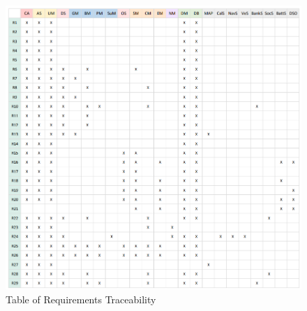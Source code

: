 \documentclass[../main.tex]{subfiles}
\begin{document}
\begin{figure}[H]
    \includegraphics[width=1.05\textwidth]{images/Traceability.png}
    \caption{Table of Requirements Traceability}
    \label{fig:traceability}
\end{figure}
\end{document}
